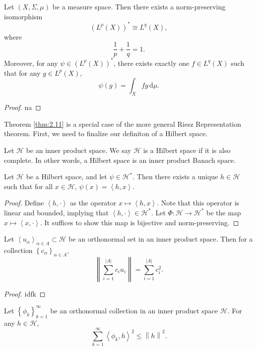 \documentclass[11pt, letterpaper]{report}
\begin{document}
\begin{theorem}\label{thm:2.11}
	Let $(X,\Sigma ,\mu )$ be a measure space. Then there exists a norm-preserving isomorphism
	\[
		\left( L^p(X) \right)^* \cong L^q(X)
	,\]
	where
	\[
		\frac{1}{p}+\frac{1}{q}=1
	.\]
	Moreover, for any $\psi \in \left( L^p(X) \right)^*$, there exists exactly one $f\in L^q(X)$ such that for any $g\in L^p(X)$,
	\[
		\psi (g)=\int_X fg \,\mathrm{d} \mu 
	.\]
\end{theorem}
\begin{proof}
	na
\end{proof}
Theorem \ref{thm:2.11} is a special case of the more general Riesz Representation theorem. First, we need to finalize our definiton of a Hilbert space.
\begin{definition}\label{dfn:2.39}
	Let $\mathcal{H} $ be an inner product space. We say $\mathcal{H} $ is a Hilbert space if it is also complete. In other words, a Hilbert space is an inner product Banach space.
\end{definition}
\begin{theorem}\label{thm:2.12}
	Let $\mathcal{H} $ be a Hilbert space, and let $\psi \in \mathcal{H}^*$. Then there exists a unique $h\in \mathcal{H} $ such that for all $x\in \mathcal{H} $, $\psi (x)=\left\langle h,x \right\rangle $.
\end{theorem}
\begin{proof}
	Define $\left\langle h,\cdot  \right\rangle $ as the operator $x\mapsto \left\langle h,x \right\rangle  $. Note that this operator is linear and bounded, implying that $\left\langle h,\cdot  \right\rangle \in \mathcal{H}^*$. Let $\Phi : \mathcal{H}  \to \mathcal{H}^*$ be the map $x\mapsto \left\langle x,\cdot  \right\rangle $. It suffices to show this map is bijective and norm-preserving.
\end{proof}
\begin{proposition}\label{prp:2.8}
	Let $\left\langle u_{\alpha } \right\rangle_{\alpha \in A}\subset \mathcal{H} $ be an orthonormal set in an inner product space. Then for a collection $\left\{ c_{\alpha } \right\}_{\alpha \in A}$,
	\[
		\left\lVert \sum_{i=1}^{\left| A \right| } c_i u_i \right\rVert =\sum_{i=1}^{\left| A \right| } c_i^2
	.\]
\end{proposition}
\begin{proof}
	idfk
\end{proof}
\begin{proposition}\label{prp:2.9}
	Let $\left\{ \phi_k \right\}_{k=1}^\infty$ be an orthonormal collection in an inner product space $\mathcal{H} $. For any $h\in \mathcal{H} $,
	\[
		\sum_{k=1}^{\infty} \left\langle \phi_k,h \right\rangle^2 \leq \left\lVert h \right\rVert^2
	.\]
\end{proposition}
\end{document}
